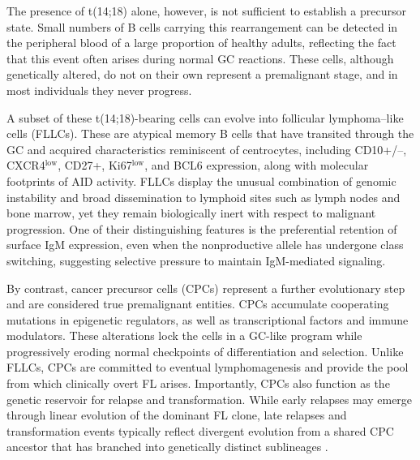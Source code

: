 The presence of t(14;18) alone, however, is not sufficient to establish a precursor state. Small numbers of B cells carrying this rearrangement can be detected in the peripheral blood of a large proportion of healthy adults, reflecting the fact that this event often arises during normal GC reactions. These cells, although genetically altered, do not on their own represent a premalignant stage, and in most individuals they never progress.

A subset of these t(14;18)-bearing cells can evolve into follicular lymphoma–like cells (FLLCs).
These are atypical memory B cells that have transited through the GC and acquired characteristics reminiscent of centrocytes, including CD10+/–, CXCR4$^{\text{low}}$, CD27+, Ki67$^{\text{low}}$, and BCL6 expression, along with molecular footprints of AID activity.
FLLCs display the unusual combination of genomic instability and broad dissemination to lymphoid sites such as lymph nodes and bone marrow, yet they remain biologically inert with respect to malignant progression.
One of their distinguishing features is the preferential retention of surface IgM expression, even when the nonproductive allele has undergone class switching, suggesting selective pressure to maintain IgM-mediated signaling. \cite{carbone_follicular_2019}

By contrast, cancer precursor cells (CPCs) represent a further evolutionary step and are considered true premalignant entities.
CPCs accumulate cooperating mutations in epigenetic regulators, as well as transcriptional factors and immune modulators.
These alterations lock the cells in a GC-like program while progressively eroding normal checkpoints of differentiation and selection.
Unlike FLLCs, CPCs are committed to eventual lymphomagenesis and provide the pool from which clinically overt FL arises.
Importantly, CPCs also function as the genetic reservoir for relapse and transformation.
While early relapses may emerge through linear evolution of the dominant FL clone, late relapses and transformation events typically reflect divergent evolution from a shared CPC ancestor that has branched into genetically distinct sublineages \cite{carbone_follicular_2019}.


